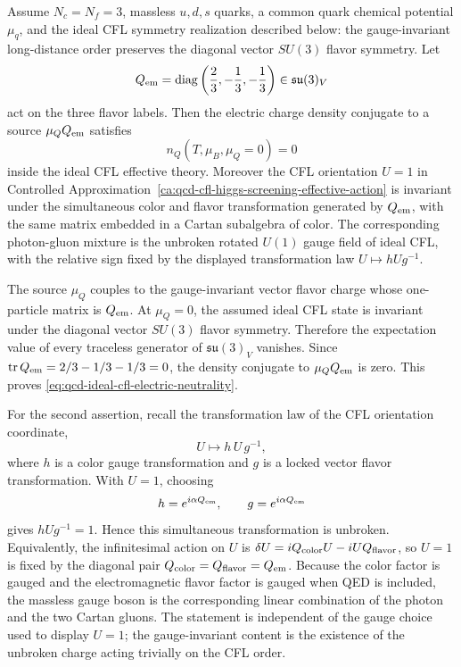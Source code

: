 \begin{remark}
\label{rem:qcd-ideal-cfl-neutrality}
Assume \(N_c=N_f=3\), massless \(u,d,s\) quarks, a common quark chemical
potential \(\mu_q\), and the ideal CFL symmetry realization described below:
the gauge-invariant long-distance order preserves the diagonal vector
\(SU(3)\) flavor symmetry.  Let
\begin{equation}
  Q_{\rm em}
  =
  \operatorname{diag}
  \left(
    \frac23,-\frac13,-\frac13
  \right)
  \in\mathfrak{su}(3)_V
  \label{eq:qcd-em-charge-matrix}
\end{equation}
act on the three flavor labels.  Then the electric charge density conjugate
to a source \(\mu_Q Q_{\rm em}\) satisfies
\begin{equation}
  n_Q(T,\mu_B,\mu_Q=0)=0
  \label{eq:qcd-ideal-cfl-electric-neutrality}
\end{equation}
inside the ideal CFL effective theory.  Moreover the CFL orientation
\(U=1\) in
Controlled Approximation~\ref{ca:qcd-cfl-higgs-screening-effective-action}
is invariant under the simultaneous color and flavor transformation generated
by \(Q_{\rm em}\), with the same matrix embedded in a Cartan subalgebra of
color.  The corresponding photon-gluon mixture is the unbroken rotated
\(U(1)\) gauge field of ideal CFL, with the relative sign fixed by the
displayed transformation law \(U\mapsto hUg^{-1}\).

The source \(\mu_Q\) couples to the gauge-invariant vector flavor charge
whose one-particle matrix is \(Q_{\rm em}\).  At \(\mu_Q=0\), the assumed
ideal CFL state is invariant under the diagonal vector \(SU(3)\) flavor
symmetry.  Therefore the expectation value of every traceless generator of
\(\mathfrak{su}(3)_V\) vanishes.  Since
\(\operatorname{tr}Q_{\rm em}=2/3-1/3-1/3=0\), the density conjugate to
\(\mu_Q Q_{\rm em}\) is zero.  This proves
\eqref{eq:qcd-ideal-cfl-electric-neutrality}.

For the second assertion, recall the transformation law of the CFL
orientation coordinate,
\[
  U\longmapsto h\,U\,g^{-1},
\]
where \(h\) is a color gauge transformation and \(g\) is a locked vector
flavor transformation.  With \(U=1\), choosing
\[
  h=e^{i\alpha Q_{\rm em}},
  \qquad
  g=e^{i\alpha Q_{\rm em}}
\]
gives \(hUg^{-1}=1\).  Hence this simultaneous transformation is unbroken.
Equivalently, the infinitesimal action on \(U\) is
\(\delta U=iQ_{\rm color}U-iUQ_{\rm flavor}\), so \(U=1\) is fixed by the
diagonal pair \(Q_{\rm color}=Q_{\rm flavor}=Q_{\rm em}\).
Because the color factor is gauged and the electromagnetic flavor factor is
gauged when QED is included, the massless gauge boson is the corresponding
linear combination of the photon and the two Cartan gluons.  The statement is
independent of the gauge choice used to display \(U=1\); the gauge-invariant
content is the existence of the unbroken charge acting trivially on the CFL
order.
\end{remark}


